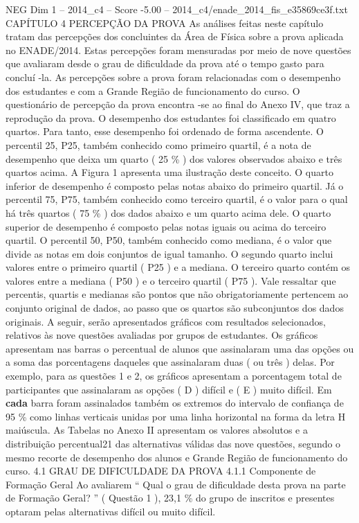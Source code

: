 \begin{textsample}{NEG Dim 1 – 2014\_c4 – Score -5.00 – 2014\_c4/enade\_2014\_fis\_e35869ce3f.txt}  \label{ex:f1_neg_121}
CAPÍTULO 4 PERCEPÇÃO DA PROVA As análises feitas neste capítulo tratam das percepções dos concluintes da Área de Física sobre a prova aplicada no ENADE/2014.
Estas percepções foram mensuradas por meio de nove questões que avaliaram desde o grau de dificuldade da prova até o tempo gasto para concluí -la.
As percepções sobre a prova foram relacionadas com o desempenho dos estudantes e com a Grande Região de funcionamento do curso.
O questionário de percepção da prova encontra -se ao final do Anexo IV, que traz a reprodução da prova.
O desempenho dos estudantes foi classificado em quatro quartos.
Para tanto, esse desempenho foi ordenado de forma ascendente.
O percentil 25, P25, também conhecido como primeiro quartil, é a nota de desempenho que deixa um quarto ( 25 \% ) dos valores observados abaixo e três quartos acima.
A Figura 1 apresenta uma ilustração deste conceito.
O quarto inferior de desempenho é composto pelas notas abaixo do primeiro quartil.
Já o percentil 75, P75, também conhecido como terceiro quartil, é o valor para o qual há três quartos ( 75 \% ) dos dados abaixo e um quarto acima dele.
O quarto superior de desempenho é composto pelas notas iguais ou acima do terceiro quartil.
O percentil 50, P50, também conhecido como mediana, é o valor que divide as notas em dois conjuntos de igual tamanho.
O segundo quarto inclui valores entre o primeiro quartil ( P25 ) e a mediana.
O terceiro quarto contém os valores entre a mediana ( P50 ) e o terceiro quartil ( P75 ).
Vale ressaltar que percentis, quartis e medianas são pontos que não obrigatoriamente pertencem ao conjunto original de dados, ao passo que os quartos são subconjuntos dos dados originais.
A seguir, serão apresentados gráficos com resultados selecionados, relativos às nove questões avaliadas por grupos de estudantes.
Os gráficos apresentam nas barras o percentual de alunos que assinalaram uma das opções ou a soma das porcentagens daqueles que assinalaram duas ( ou três ) delas.
Por exemplo, para as questões 1 e 2, os gráficos apresentam a porcentagem total de participantes que assinalaram as opções ( D ) difícil e ( E ) muito difícil.
Em \textbf{cada} barra foram assinalados também os extremos do intervalo de confiança de 95 \% como linhas verticais unidas por uma linha horizontal na forma da letra H maiúscula.
As Tabelas no Anexo II apresentam os valores absolutos e a distribuição percentual21 das alternativas válidas das nove questões, segundo o mesmo recorte de desempenho dos alunos e Grande Região de funcionamento do curso. 4.1 GRAU DE DIFICULDADE DA PROVA 4.1.1 Componente de Formação Geral Ao avaliarem “ Qual o grau de dificuldade desta prova na parte de Formação Geral? ” ( Questão 1 ), 23,1 \% do grupo de inscritos e presentes optaram pelas alternativas difícil ou muito difícil.

\end{textsample}
